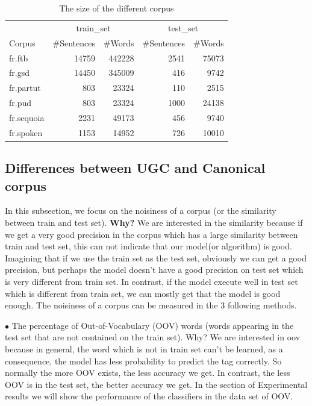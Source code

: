 \documentclass{article}
\begin{document}
\begin{table}[h]
    \caption{The size of the different corpus}
    \vspace{5pt}
    \centering
    
\begin{tabular}{|l|rr|rr|}
\hline
\multicolumn{1}{|c|}{\ } & \multicolumn{2}{c|}{train\_set} & \multicolumn{2}{c|}{test\_set}\\ 
\cline{2-5}
Corpus & \#Sentences & \#Words & \#Sentences & \#Words\\
\hline
fr.ftb     & 14759 & 442228 & 2541 & 75073 \\
fr.gsd     & 14450 & 345009 & 416  & 9742\\
fr.partut  & 803   & 23324  & 110  & 2515\\
fr.pud     & 803   & 23324  & 1000 & 24138\\
fr.sequoia & 2231  & 49173  & 456  & 9740\\
fr.spoken  & 1153  & 14952  & 726  & 10010\\
\hline
\end{tabular}
\label{table_size}
\end{table}


\subsection{Differences between UGC and Canonical corpus}
In this subsection, we focus on the noisiness of a corpus (or the similarity between train and test set).  \textbf{Why?} We are interested in the similarity because if we get a very good precision in the corpus which has a large similarity between train and test set, this can not indicate that our model(or algorithm) is good. Imagining that if we use the train set as the test set, obviously we can get a good precision, but perhaps the model doesn't have a good precision on test set which is very different from train set. In contrast, if the model execute well in test set which is different from train set, we can mostly get that the model is good enough. The noisiness of a corpus can be measured in the 3 following methods.

$\bullet$ The percentage of Out-of-Vocabulary (OOV) words (words appearing in the test set that are not contained on the train set).
\textsf{Why?} We are interested in oov because in general, the word which is not in train set can't be learned, as a consequence, the model has less probability to predict the tag correctly. So normally the more OOV exists, the less accuracy we get. In contrast, the less OOV is in the test set, the better accuracy we get. In the section of Experimental results we will show the performance of the classifiers in the data set of OOV.
\end{document}
